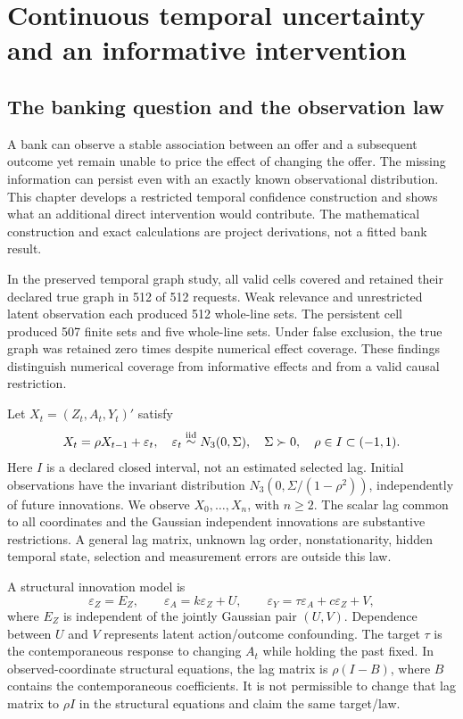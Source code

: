 \chapter{Continuous temporal uncertainty and an informative intervention}
\label{exec13:temporal-region}

\hypertarget{the-banking-question-and-the-observation-law}{%
\section{The banking question and the observation
law}\label{the-banking-question-and-the-observation-law}}

A bank can observe a stable association between an offer and a
subsequent outcome yet remain unable to price the effect of changing the
offer. The missing information can persist even with an exactly known
observational distribution. This chapter develops a restricted temporal
confidence construction and shows what an additional direct intervention
would contribute. The mathematical construction and exact calculations
are project derivations, not a fitted bank result.
\cite{exec13_temporal_argument,exec13_temporal_exact}

In the preserved temporal graph study, all valid cells covered and
retained their declared true graph in 512 of 512 requests. Weak
relevance and unrestricted latent observation each produced 512
whole-line sets. The persistent cell produced 507 finite sets and five
whole-line sets. Under false exclusion, the true graph was retained zero
times despite numerical effect coverage. These findings distinguish
numerical coverage from informative effects and from a valid causal
restriction. \cite{exec13_temporal_predecessor}

Let \(X_t=(Z_t,A_t,Y_t)'\) satisfy \[
 X_t=\rho X_{t-1}+\varepsilon_t,\quad
 \varepsilon_t\mathrel{\mathop\sim^{\rm iid}}N_3(0,\Sigma),\quad
 \Sigma\succ0,\quad \rho\in I\subset(-1,1).
\] Here \(I\) is a declared closed interval, not an estimated selected
lag. Initial observations have the invariant distribution
\(N_3(0,\Sigma/(1-\rho^2))\), independently of future innovations. We
observe \(X_0,\ldots,X_n\), with \(n\ge2\). The scalar lag common to all
coordinates and the Gaussian independent innovations are substantive
restrictions. A general lag matrix, unknown lag order, nonstationarity,
hidden temporal state, selection and measurement errors are outside this
law.

A structural innovation model is \[
 \varepsilon_Z=E_Z,\qquad
 \varepsilon_A=k\varepsilon_Z+U,\qquad
 \varepsilon_Y=\tau\varepsilon_A+c\varepsilon_Z+V,
\] where \(E_Z\) is independent of the jointly Gaussian pair \((U,V)\).
Dependence between \(U\) and \(V\) represents latent action/outcome
confounding. The target \(\tau\) is the contemporaneous response to
changing \(A_t\) while holding the past fixed. In observed-coordinate
structural equations, the lag matrix is \(\rho(I-B)\), where \(B\)
contains the contemporaneous coefficients. It is not permissible to
change that lag matrix to \(\rho I\) in the structural equations and
claim the same target/law.

